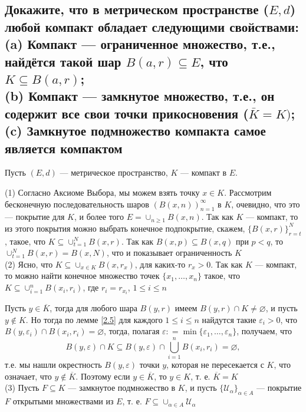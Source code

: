 \documentclass[a4paper]{article}
\begin{document}
\subsection{Докажите, что в метрическом пространстве ($E, d$) любой компакт обладает следующими свойствами:\\
(a) Компакт — ограниченное множество, т.е., найдётся такой шар $B(a, r) \subseteq E$, что $K \subseteq B(a, r)$;\\
(b) Компакт — замкнутое множество, т.е., он содержит все свои точки прикосновения ($\bar{K}=K)$;\\
(c) Замкнутое подмножество компакта самое является компактом}
Пусть $(E,d)$ — метрическое пространство, $K$ — компакт в $E$.
\label{2.7}

(1)  Согласно Аксиоме Выбора, мы можем взять точку $x\in K$. Рассмотрим бесконечную последовательность шаров $(B(x,n))_{n=1}^\infty$ в $K$, очевидно, что это — покрытие для $K$, и более того $E = \cup_{n \ge 1} B(x,n)$. Так как $K$ — компакт, то из этого покрытия можно выбрать конечное подпокрытие, скажем, $\{B(x,r)\}_{r=t}^N$, такое, что $K \subseteq \cup_{t=1}^N B(x,r)$. Так как $B(x,p) \subseteq B(x,q)$ при $p<q$, то $\cup_{t=1}^N B(x,r) = B(x,N)$, что и показывает ограниченность $K$\\[2mm]

(2) Ясно, что $K \subseteq \cup_{x \in K} B(x,r_x)$, для каких-то $r_x >0$. Так как $K$ — компакт, то можно найти конечное множество точек $\{x_1,\ldots, x_n\}$ такое, что $K \subseteq \cup_{i=1}^n B(x_i, r_i)$, где $r_i = r_{x_i}$, $1\le i \le n$

Пусть $y\in \overline{K}$, тогда для любого шара $B(y,r)$ имеем $B(y,r ) \cap K  \ne \varnothing$, и пусть $y\notin K$. Но тогда по лемме \ref{2.5} для каждого $1\le i \le n$ найдутся такие $\varepsilon_i>0$, что $B(y, \varepsilon_i) \cap B(x_i, r_i) = \varnothing$, тогда, полагая $\varepsilon: = \min \{\varepsilon_1, \ldots, \varepsilon_n\}$, получаем, что
$$
B(y, \varepsilon) \cap K \subseteq B(y, \varepsilon) \cap \bigcup_{i=1}^n B(x_i,r_i) = \varnothing,
$$
т.е. мы нашли окрестность $B(y, \varepsilon)$ точки $y$, которая не пересекается с $K$, что означает, что $y \notin \overline{K}$. Поэтому если $y\in \overline{K}$, то $y \in K$, т. е. $\overline{K} = K$\\[2mm]

(3) Пусть $F \subseteq K$ — замкнутое подмножество в $K$, и пусть $\{\mathscr{U}_\alpha\}_{\alpha \in A}$ — покрытие $F$ открытыми множествами из $E$, т. е. $F \subseteq \cup_{\alpha \in A} \mathscr{U}_\alpha$\\[2mm]
\end{document}
